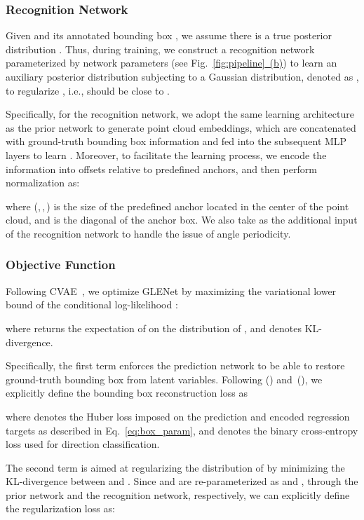 \documentclass[twocolumn]{svjour3}
\begin{document}
\subsubsection{Recognition Network}
Given  and its annotated bounding box , we assume there is a true posterior distribution . Thus, during training, we construct a recognition network parameterized by network parameters  (see Fig.~\hyperref[fig:pipeline]{\ref{fig:pipeline}~(b)}) to learn an auxiliary posterior distribution  subjecting to a Gaussian distribution, denoted as , to regularize , i.e.,  should be close to .

Specifically, for the recognition network, we adopt the same learning architecture as the prior network to generate point cloud embeddings, which are concatenated with ground-truth bounding box information and fed into the subsequent MLP layers to learn . Moreover, to facilitate the learning process, we encode the information  into offsets relative to predefined anchors, and then perform normalization as:

where (,\,,\,) is the size of the predefined anchor located in the center of the point cloud, and  is the diagonal of the anchor box. We also take  as the additional input of the recognition network to handle the issue of angle periodicity.

\subsubsection{Objective Function}
Following CVAE~\cite{sohn2015learning}, we optimize GLENet by maximizing the variational lower bound of the conditional log-likelihood :

where  returns the expectation of  on the distribution of , and  denotes KL-divergence. 



Specifically, the first term  enforces the prediction network to be able to restore ground-truth bounding box from latent variables. Following (\cite{yan2018second}) and~(\cite{deng2021voxel}), we explicitly define the bounding box reconstruction loss as

where  denotes the Huber loss imposed on the prediction and encoded regression targets as described in Eq.~\eqref{eq:box_param}, and  denotes the binary cross-entropy loss used for direction classification.

The second term  is aimed at regularizing the distribution of  by minimizing the KL-divergence between  and . Since  and  are re-parameterized as  and ,  through the prior network and the recognition network, respectively, we can explicitly define the regularization loss as:
\end{document}
